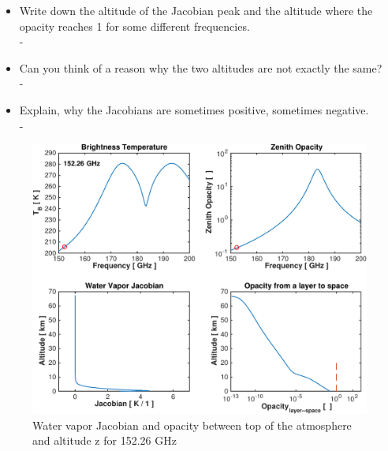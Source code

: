 \documentclass[paper=a4, fontsize=11pt]{scrartcl} %
\begin{document}
\begin{itemize}
	\item Write down the altitude of the Jacobian peak and the altitude where the opacity reaches 1 for some different frequencies. \ \\ -
	
	\item Can you think of a reason why the two altitudes are not exactly the same? \ \\ -
	
	\item Explain, why the Jacobians are sometimes positive, sometimes negative. \ \\ -
\end{itemize}

\begin{figure}[h]
\centering
	\includegraphics[width=\textwidth]{plots/jac_152GHz.pdf}
	\caption{Water vapor Jacobian and opacity between top of the atmosphere and altitude z for 152.26 GHz}
\end{figure}
\end{document}
